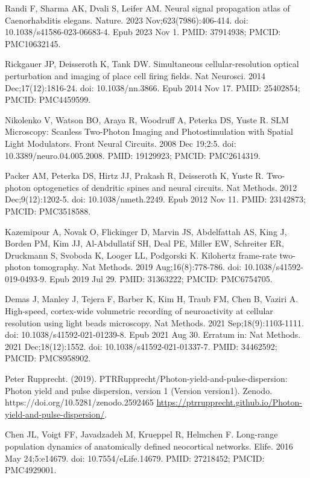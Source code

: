 \documentclass[10pt,letterpaper]{article}
\begin{document}
\begin{thebibliography}{10}
Randi F, Sharma AK, Dvali S, Leifer AM. Neural signal propagation atlas of Caenorhabditis elegans. Nature. 2023 Nov;623(7986):406-414. doi: 10.1038/s41586-023-06683-4. Epub 2023 Nov 1. PMID: 37914938; PMCID: PMC10632145.

Rickgauer JP, Deisseroth K, Tank DW. Simultaneous cellular-resolution optical perturbation and imaging of place cell firing fields. Nat Neurosci. 2014 Dec;17(12):1816-24. doi: 10.1038/nn.3866. Epub 2014 Nov 17. PMID: 25402854; PMCID: PMC4459599.

Nikolenko V, Watson BO, Araya R, Woodruff A, Peterka DS, Yuste R. SLM Microscopy: Scanless Two-Photon Imaging and Photostimulation with Spatial Light Modulators. Front Neural Circuits. 2008 Dec 19;2:5. doi: 10.3389/neuro.04.005.2008. PMID: 19129923; PMCID: PMC2614319.

Packer AM, Peterka DS, Hirtz JJ, Prakash R, Deisseroth K, Yuste R. Two-photon optogenetics of dendritic spines and neural circuits. Nat Methods. 2012 Dec;9(12):1202-5. doi: 10.1038/nmeth.2249. Epub 2012 Nov 11. PMID: 23142873; PMCID: PMC3518588.

Kazemipour A, Novak O, Flickinger D, Marvin JS, Abdelfattah AS, King J, Borden PM, Kim JJ, Al-Abdullatif SH, Deal PE, Miller EW, Schreiter ER, Druckmann S, Svoboda K, Looger LL, Podgorski K. Kilohertz frame-rate two-photon tomography. Nat Methods. 2019 Aug;16(8):778-786. doi: 10.1038/s41592-019-0493-9. Epub 2019 Jul 29. PMID: 31363222; PMCID: PMC6754705.

Demas J, Manley J, Tejera F, Barber K, Kim H, Traub FM, Chen B, Vaziri A. High-speed, cortex-wide volumetric recording of neuroactivity at cellular resolution using light beads microscopy. Nat Methods. 2021 Sep;18(9):1103-1111. doi: 10.1038/s41592-021-01239-8. Epub 2021 Aug 30. Erratum in: Nat Methods. 2021 Dec;18(12):1552. doi: 10.1038/s41592-021-01337-7. PMID: 34462592; PMCID: PMC8958902.

Peter Rupprecht. (2019). PTRRupprecht/Photon-yield-and-pulse-dispersion: Photon yield and pulse dispersion, version 1 (Version version1). Zenodo. https://doi.org/10.5281/zenodo.2592465 \url{https://ptrrupprecht.github.io/Photon-yield-and-pulse-dispersion/}.

Chen JL, Voigt FF, Javadzadeh M, Krueppel R, Helmchen F. Long-range population dynamics of anatomically defined neocortical networks. Elife. 2016 May 24;5:e14679. doi: 10.7554/eLife.14679. PMID: 27218452; PMCID: PMC4929001.


\end{thebibliography}
\end{document}
